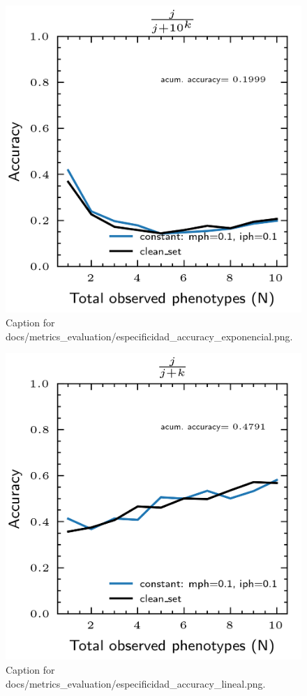 \documentclass{article}
\begin{document}
\begin{figure}[h] \centering \includegraphics{docs/metrics_evaluation/especificidad_accuracy_exponencial.png} \caption{Caption for docs/metrics_evaluation/especificidad_accuracy_exponencial.png.} \end{figure}
\begin{figure}[h] \centering \includegraphics{docs/metrics_evaluation/especificidad_accuracy_lineal.png} \caption{Caption for docs/metrics_evaluation/especificidad_accuracy_lineal.png.} \end{figure}
\end{document}
